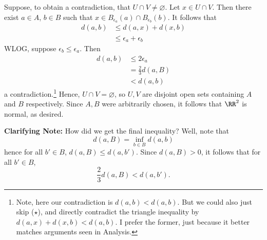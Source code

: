 \documentclass{fkpset}
\begin{document}
\begin{solution}
    Suppose, to obtain a contradiction, that $U \cap V \neq
    \varnothing$. Let $x \in U \cap V$. Then there exist $a \in A$, $b
    \in B$ such that $x \in B_{\epsilon_a}(a) \cap B_{\epsilon_b}(b)$.
    It follows that
    \begin{align*}
      d(a,b)
      &\leq d(a,x) + d(x,b) \tag{$\star$}\\
      &\leq \epsilon_a + \epsilon_b
    \end{align*}
    WLOG, suppose $\epsilon_b \leq \epsilon_a$. Then
    \begin{align*}
      d(a,b)
      &\leq 2\epsilon_a \\
      &= \frac{2}{3} d(a,B)  \\
      &< d(a,b)
    \end{align*}
    a contradiction.\footnote{Note, here our contradiction is $d(a,b)
      < d(a,b)$. But we could also just skip ($\star$), and directly
      contradict the triangle inequality by $d(a,x) + d(x,b) <
      d(a,b)$. I prefer the former, just because it better matches
      arguments seen in Analysis.} Hence, $U \cap V = \varnothing$, so
    $U,V$ are disjoint open sets containing $A$ and $B$ respectively.
    Since $A,B$ were arbitrarily chosen, it follows that $\RR^2$ is
    normal, as desired.
    \begin{leftbar}
      \color{red} \textbf{Clarifying Note:} How did we get the final
      inequality? Well, note that
      \[
        d(a,B) = \inf_{b \in B} d(a,b)
      \]
      hence for all $b' \in B$, $d(a,B) \leq d(a,b')$. Since $d(a,B) >
      0$, it follows that for all $b' \in B$,
      \[
        \frac{2}{3}d(a,B) < d(a,b').
      \]
    \end{leftbar}
  \end{solution}
  \clearpage

\end{document}
